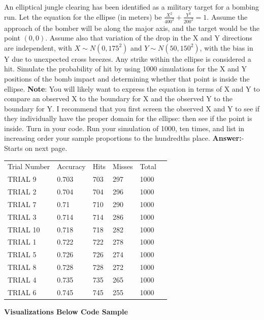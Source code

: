 \documentclass[svgnames]{article}
\begin{document}
An elliptical jungle clearing has been identified as a military target for a bombing run. Let the equation for the ellipse (in meters) be $\frac{X^2}{400^2} +\frac{Y^2}{200^2} = 1$. Assume the approach of the bomber will be along the major axis, and the target would be the point $(0, 0)$. Assume also that variation of the drop in the X and Y directions are independent, with $X \sim N(0, 175^2)$ and $Y \sim N(50, 150^2)$, with the bias in Y due to unexpected cross breezes. Any strike within the ellipse is considered a hit. Simulate the probability of hit by using 1000 simulations for the X and Y positions of the bomb impact and determining whether that point is inside the ellipse. 
\newline
\newline
\textbf{Note}: You will likely want to express the equation in terms of X and Y to compare an observed X to the boundary for X and the observed Y to the boundary for Y. I recommend that you first screen the observed X and Y to see if they individually have the proper domain for the ellipse: then see if the point is inside. Turn in your code. Run your simulation of 1000, ten times, and list in increasing order your sample proportions to the hundredths place.
\newline
\newline
\newline
\pagebreak
\textbf{Answer:}-Starts on next page.
\begin{table}[]
\begin{tabular}{llllll}
Trial Number&Accuracy&Hits&Misses &Total&\\
TRIAL 9&0.703&703&297&1000&\\
TRIAL 2&0.704&704&296&1000&\\
TRIAL 7&0.71&710&290&1000&\\
TRIAL 3&0.714&714&286&1000&\\
TRIAL 10&0.718&718&282&1000&\\
TRIAL 1&0.722&722&278&1000&\\
TRIAL 5&0.726&726&274&1000&\\
TRIAL 8&0.728&728&272&1000&\\
TRIAL 4&0.735&735&265&1000&\\
TRIAL 6&0.745&745&255&1000&\\
\end{tabular}
\end{table}
\newline
\textbf{Visualizations Below Code Sample}
\newline
\newline
\end{document}
